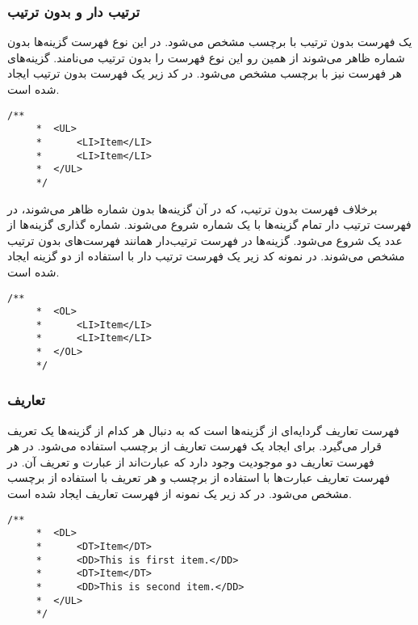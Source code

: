\subsubsection{ ترتیب دار و بدون ترتیب}
یک فهرست بدون ترتیب با برچسب  مشخص می‌شود. در این نوع فهرست گزینه‌ها بدون شماره ظاهر
می‌شوند  از همین رو این نوع فهرست را بدون ترتیب می‌نامند. گزینه‌های هر فهرست نیز با برچسب  مشخص
می‌شود. در کد زیر یک فهرست بدون ترتیب ایجاد شده است.
\begin{latin}
\lstset{language=C++}  
\begin{lstlisting}[frame=single] 
    /**
     *	<UL>
     * 		<LI>Item</LI>
     * 		<LI>Item</LI>
     * 	</UL>
     */
\end{lstlisting}
\end{latin}
برخلاف فهرست بدون ترتیب، که در آن گزینه‌ها بدون شماره ظاهر می‌شوند، در فهرست ترتیب دار تمام گزینه‌ها با 
یک شماره شروع می‌شوند. شماره گذاری گزینه‌ها از عدد یک شروع می‌شود. گزینه‌ها در فهرست ترتیب‌دار همانند
فهرست‌های بدون ترتیب مشخص می‌شوند. در نمونه کد زیر یک فهرست ترتیب دار با استفاده از دو گزینه ایجاد
شده است.
\begin{latin}
\lstset{language=C++}  
\begin{lstlisting}[frame=single] 
    /**
     *	<OL>
     * 		<LI>Item</LI>
     * 		<LI>Item</LI>
     * 	</OL>
     */
\end{lstlisting}
\end{latin}

\subsubsection{تعاریف}
فهرست تعاریف گردایه‌ای از گزینه‌ها است که به دنبال هر کدام از گزینه‌ها یک تعریف قرار می‌گیرد.
برای ایجاد یک فهرست تعاریف از برچسب  استفاده می‌شود. در هر فهرست تعاریف دو
موجودیت وجود دارد که عبارت‌اند از عبارت و تعریف آن. در فهرست تعاریف عبارت‌ها با استفاده
از برچسب  و هر تعریف با استفاده از برچسب  مشخص می‌شود. در کد زیر 
یک نمونه از فهرست تعاریف ایجاد شده است.
\begin{latin}
\lstset{language=C++}  
\begin{lstlisting}[frame=single] 
    /**
     *	<DL>
     * 		<DT>Item</DT>
     * 		<DD>This is first item.</DD>
     * 		<DT>Item</DT>
     * 		<DD>This is second item.</DD>
     * 	</UL>
     */
\end{lstlisting}
\end{latin}

